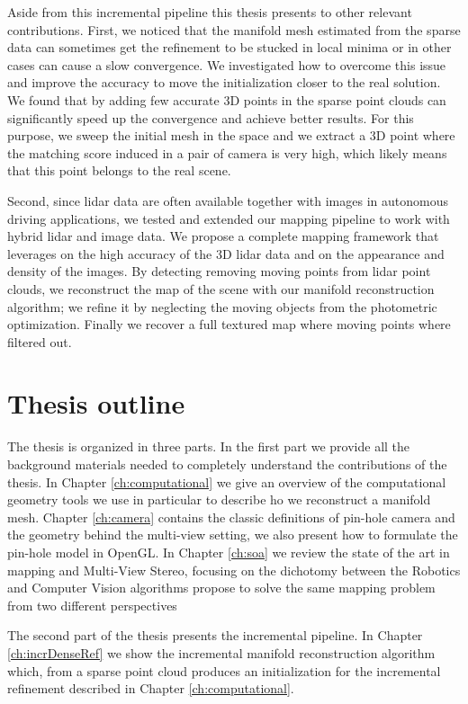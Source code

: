 Aside from this incremental pipeline this thesis presents to other relevant contributions.
First, we noticed that the manifold mesh estimated from the sparse data can sometimes get the refinement to be stucked  in local minima or in other cases can cause a slow convergence. 
We investigated how to overcome this issue and improve the accuracy to move the initialization closer to the real solution.
We found that by adding few accurate 3D points in the sparse point clouds can significantly speed up the convergence and achieve better results.
For this purpose, we sweep the initial mesh in the space and we extract a 3D point where the matching score induced in a pair of camera is very high, which likely means that this point belongs to the real scene.

Second, since lidar data are often available together with images in autonomous driving applications, we tested and extended our mapping pipeline to work with hybrid lidar and image data.
We propose a complete mapping framework  that leverages on the high accuracy of the 3D lidar data and on the appearance and density of the images.
By detecting removing moving points from lidar point clouds, we reconstruct the map of the scene with our manifold reconstruction algorithm; we refine it by neglecting the moving objects from the photometric optimization. Finally we recover a full textured map where moving points where filtered out.



\section{Thesis outline}

The thesis is organized in three parts. 
In the first part we provide all the background materials needed to completely understand the contributions of the thesis.
In Chapter \ref{ch:computational} we give an overview of the computational geometry tools we use in particular to describe ho we reconstruct a manifold mesh.  
Chapter \ref{ch:camera} contains the classic definitions of pin-hole camera and the geometry behind the  multi-view setting, we also present how to formulate the pin-hole model in OpenGL.
In Chapter \ref{ch:soa} we review the state of the art in mapping and Multi-View Stereo, focusing on the dichotomy between the Robotics and  Computer Vision algorithms propose to solve the same mapping problem from two different perspectives

The second part of the thesis presents the incremental pipeline. 
In Chapter \ref{ch:incrDenseRef} we show the incremental manifold reconstruction algorithm which, from a sparse point cloud produces an initialization for the incremental refinement described in  Chapter \ref{ch:computational}.

